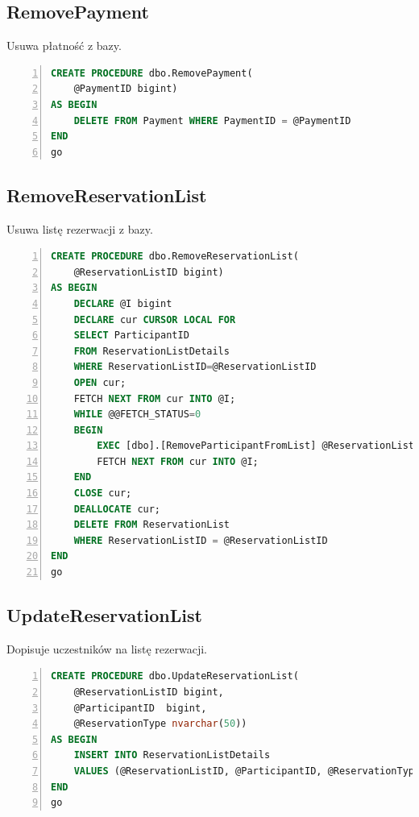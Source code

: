 \documentclass[]{article}
\begin{document}
	\subsection{RemovePayment}
	Usuwa płatność z bazy.
	\begin{lstlisting}[language=SQL,
		showspaces=false,
		basicstyle=\ttfamily,
		numbers=left,
		numberstyle=\tiny,
		backgroundcolor=\color{lightg},
		keywordstyle=\color{lightblue},
		commentstyle=\color{gray}]
CREATE PROCEDURE dbo.RemovePayment(
	@PaymentID bigint)
AS BEGIN
	DELETE FROM Payment WHERE PaymentID = @PaymentID
END
go
	\end{lstlisting}

	\subsection{RemoveReservationList}
	Usuwa listę rezerwacji z bazy.
	\begin{lstlisting}[language=SQL,
						showspaces=false,
						basicstyle=\ttfamily,
						numbers=left,
						numberstyle=\tiny,
						backgroundcolor=\color{lightg},
						keywordstyle=\color{lightblue},
						commentstyle=\color{gray}]
CREATE PROCEDURE dbo.RemoveReservationList(
	@ReservationListID bigint)
AS BEGIN
	DECLARE @I bigint
	DECLARE cur CURSOR LOCAL FOR
	SELECT ParticipantID
	FROM ReservationListDetails
	WHERE ReservationListID=@ReservationListID
	OPEN cur;
	FETCH NEXT FROM cur INTO @I;
	WHILE @@FETCH_STATUS=0
	BEGIN
		EXEC [dbo].[RemoveParticipantFromList] @ReservationListID, @I
		FETCH NEXT FROM cur INTO @I;
	END
	CLOSE cur;
	DEALLOCATE cur;
	DELETE FROM ReservationList
	WHERE ReservationListID = @ReservationListID
END
go
	\end{lstlisting}
	
	\subsection{UpdateReservationList}
	Dopisuje uczestników na listę rezerwacji.
	\begin{lstlisting}[language=SQL,
						showspaces=false,
						basicstyle=\ttfamily,
						numbers=left,
						numberstyle=\tiny,
						backgroundcolor=\color{lightg},
						keywordstyle=\color{lightblue},
						commentstyle=\color{gray}]
CREATE PROCEDURE dbo.UpdateReservationList(
	@ReservationListID bigint,
	@ParticipantID	bigint,
	@ReservationType nvarchar(50))
AS BEGIN
	INSERT INTO ReservationListDetails
	VALUES (@ReservationListID, @ParticipantID, @ReservationType)
END
go	
	\end{lstlisting}
	
\end{document}
